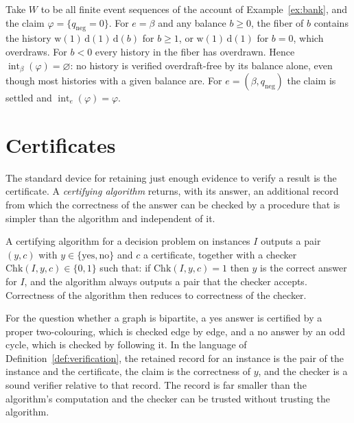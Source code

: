 \begin{example}\label{ex:no-verify}
Take $W$ to be all finite event sequences of the account of Example~\ref{ex:bank}, and the claim $\varphi=\{q_{\mathrm{neg}}=0\}$. For $e=\beta$ and any balance $b\ge0$, the fiber of $b$ contains the history $\mathrm{w}(1)\,\mathrm{d}(1)\,\mathrm{d}(b)$ for $b\ge1$, or $\mathrm{w}(1)\,\mathrm{d}(1)$ for $b=0$, which overdraws. For $b<0$ every history in the fiber has overdrawn. Hence $\operatorname{int}_\beta(\varphi)=\varnothing$: no history is verified overdraft-free by its balance alone, even though most histories with a given balance are. For $e=(\beta,q_{\mathrm{neg}})$ the claim is settled and $\operatorname{int}_e(\varphi)=\varphi$.
\end{example}

\section{Certificates}

The standard device for retaining just enough evidence to verify a result is the certificate. A \emph{certifying algorithm} returns, with its answer, an additional record from which the correctness of the answer can be checked by a procedure that is simpler than the algorithm and independent of it.

\begin{established}\label{def:certifying}
A certifying algorithm for a decision problem on instances $I$ outputs a pair $(y,c)$ with $y\in\{\text{yes},\text{no}\}$ and $c$ a certificate, together with a checker $\mathrm{Chk}(I,y,c)\in\{0,1\}$ such that: if $\mathrm{Chk}(I,y,c)=1$ then $y$ is the correct answer for $I$, and the algorithm always outputs a pair that the checker accepts. Correctness of the algorithm then reduces to correctness of the checker.
\end{established}

\begin{example}[Bipartiteness]
For the question whether a graph is bipartite, a yes answer is certified by a proper two-colouring, which is checked edge by edge, and a no answer by an odd cycle, which is checked by following it. In the language of Definition~\ref{def:verification}, the retained record for an instance is the pair of the instance and the certificate, the claim is the correctness of $y$, and the checker is a sound verifier relative to that record. The record is far smaller than the algorithm's computation and the checker can be trusted without trusting the algorithm.
\end{example}

